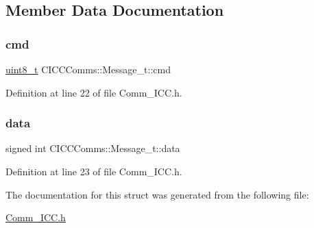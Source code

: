 \subsection{Member Data Documentation}
\mbox{\label{struct_c_i_c_c_comms_1_1_message__t_adf3e3290f54ee3997bc837463a340d05}} 
\subsubsection{\texorpdfstring{cmd}{cmd}}
{\footnotesize\ttfamily \mbox{\hyperlink{_a_d_a_s___types_8h_aba7bc1797add20fe3efdf37ced1182c5}{uint8\+\_\+t}} C\+I\+C\+C\+Comms\+::\+Message\+\_\+t\+::cmd}



Definition at line 22 of file Comm\+\_\+\+I\+C\+C.\+h.

\mbox{\label{struct_c_i_c_c_comms_1_1_message__t_a25cfce11e78d103524b695b281629d75}} 
\subsubsection{\texorpdfstring{data}{data}}
{\footnotesize\ttfamily signed int C\+I\+C\+C\+Comms\+::\+Message\+\_\+t\+::data}



Definition at line 23 of file Comm\+\_\+\+I\+C\+C.\+h.



The documentation for this struct was generated from the following file\+:\begin{DoxyCompactItemize}
\item 
\mbox{\hyperlink{_comm___i_c_c_8h}{Comm\+\_\+\+I\+C\+C.\+h}}\end{DoxyCompactItemize}
